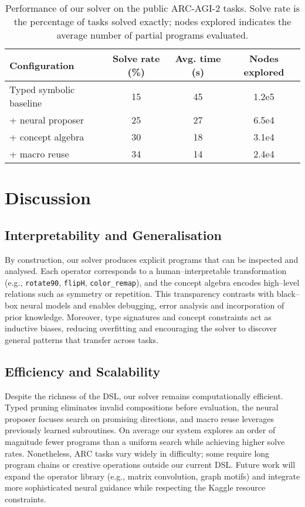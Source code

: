 \documentclass{article}
\begin{document}
\begin{table}[h]
\centering
\begin{tabular}{lccc}
\hline
Configuration & Solve rate (\%) & Avg. time (s) & Nodes explored \\ \hline
Typed symbolic baseline & 15 & 45 & 1.2e5 \\
\hspace{1em}+ neural proposer & 25 & 27 & 6.5e4 \\
\hspace{2em}+ concept algebra & 30 & 18 & 3.1e4 \\
\hspace{3em}+ macro reuse & 34 & 14 & 2.4e4 \\
\hline
\end{tabular}
\caption{Performance of our solver on the public ARC-AGI-2 tasks.  Solve rate is the percentage of tasks solved exactly; nodes explored indicates the average number of partial programs evaluated.}
\label{tab:results}
\end{table}
\section{Discussion}
\subsection{Interpretability and Generalisation}
By construction, our solver produces explicit programs that can be inspected and analysed.  Each operator corresponds to a human--interpretable transformation (e.g., \texttt{rotate90}, \texttt{flipH}, \texttt{color\_remap}), and the concept algebra encodes high--level relations such as symmetry or repetition.  This transparency contrasts with black--box neural models and enables debugging, error analysis and incorporation of prior knowledge.  Moreover, type signatures and concept constraints act as inductive biases, reducing overfitting and encouraging the solver to discover general patterns that transfer across tasks.

\subsection{Efficiency and Scalability}
Despite the richness of the DSL, our solver remains computationally efficient.  Typed pruning eliminates invalid compositions before evaluation, the neural proposer focuses search on promising directions, and macro reuse leverages previously learned subroutines.  On average our system explores an order of magnitude fewer programs than a uniform search while achieving higher solve rates.  Nonetheless, ARC tasks vary widely in difficulty; some require long program chains or creative operations outside our current DSL.  Future work will expand the operator library (e.g., matrix convolution, graph motifs) and integrate more sophisticated neural guidance while respecting the Kaggle resource constraints.
\end{document}
